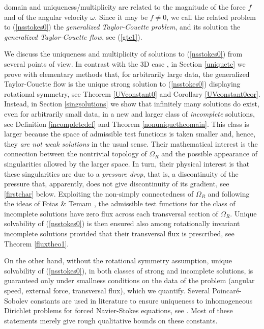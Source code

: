 \documentclass[a4paper,11pt]{article}
\numberwithin{equation}{section}
\numberwithin{figure}{section}
\def\eq#1{(\ref{#1})}
\begin{document}
domain and uniqueness/multiplicity are related to the magnitude of the force $f$ and of the angular velocity $\omega$. Since it may be
$f\neq0$, we call the related problem to \eq{nsstokes0} the {\it generalized Taylor-Couette problem}, and its solution the {\it generalized Taylor-Couette flow}, see \eq{gtc1}.\par
We discuss the uniqueness and multiplicity of solutions to \eq{nsstokes0} from several points of view. In contrast with the 3D case \cite{velte1966stabilitat,judovich1966secondary}, in Section \ref{uniquetc} we prove with elementary methods that, for arbitrarily large data, the generalized
Taylor-Couette flow is the unique strong solution to \eq{nsstokes0} displaying rotational symmetry, see Theorem \ref{UVconstant0} and Corollary \ref{UVconstant0cor}. Instead, in Section \ref{singsolutions} we show that infinitely many solutions do exist, even for arbitrarily small data,
in a new and larger class of \textit{incomplete} solutions, see Definition \ref{incompletedef} and Theorem \ref{nonuniquetheomain}. This class is larger because the space of admissible test functions is taken smaller and, hence, they {\em are not weak solutions}
in the usual sense. Their mathematical interest is the connection between the nontrivial topology of $\Omega_R$ and the possible appearance of
singularities allowed by the larger space. In turn, their physical interest is that these singularities are due to a {\em pressure drop}, that is,
a discontinuity of the pressure that, apparently, does not give discontinuity of its gradient, see \eqref{firstchar} below. Exploiting the non-simply connectedness of $\Omega_R$ and following the ideas of Foias \& Temam \cite{foiastemam78}, the admissible test functions for the class of incomplete solutions have zero flux across each transversal section of $\Omega_{R}$. Unique solvability of \eq{nsstokes0} is then ensured
also among rotationally invariant incomplete solutions provided that their transversal flux is prescribed, see Theorem \ref{fluxtheo1}.\par
On the other hand, without the rotational symmetry assumption, unique solvability of \eq{nsstokes0}, in both classes of strong
and incomplete solutions, is guaranteed only under smallness conditions on the data of the problem (angular speed, external force,
transversal flux),
which we quantify. Several Poincaré-Sobolev constants are used in literature to ensure uniqueness to inhomogeneous Dirichlet problems for forced Navier-Stokes
equations, see \cite[Section IX.4]{galdi2011introduction}. Most of these statements merely give rough qualitative bounds on these constants.
\end{document}

